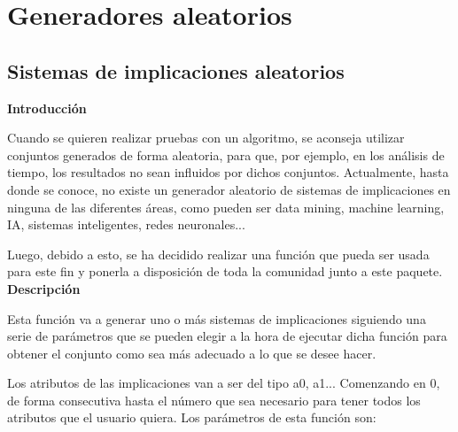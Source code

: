 \section{Generadores aleatorios}

\subsection{Sistemas de implicaciones aleatorios}

    \textbf{Introducci\'on}

    Cuando se quieren realizar pruebas con un algoritmo, se aconseja utilizar conjuntos generados de forma aleatoria, para que, por ejemplo, 
    en los an\'alisis de tiempo, los resultados no sean influidos por dichos conjuntos. Actualmente, hasta donde se conoce, no existe un 
    generador aleatorio de sistemas de implicaciones en ninguna de las diferentes \'areas, como pueden ser data mining, machine learning, 
    IA, sistemas inteligentes, redes neuronales...

    Luego, debido a esto, se ha decidido realizar una funci\'on que pueda ser usada para este fin y ponerla a disposici\'on de toda la comunidad 
    junto a este paquete.
    \\ 


    \textbf{Descripci\'on}
    
    Esta funci\'on va a generar uno o m\'as sistemas de implicaciones siguiendo una serie de par\'ametros que se pueden elegir a la 
    hora de ejecutar dicha funci\'on para obtener el conjunto como sea m\'as adecuado a lo que se desee hacer.

    Los atributos de las implicaciones van a ser del tipo a0, a1... Comenzando en 0, de forma consecutiva hasta el n\'umero que sea 
    necesario para tener todos los atributos que el usuario quiera. Los par\'ametros de esta funci\'on son:

